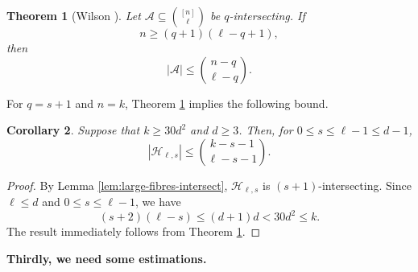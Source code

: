 \documentclass[11pt]{article}
\numberwithin{equation}{section}
\newtheorem{theorem}{Theorem}[section]
\newtheorem{corollary}[theorem]{Corollary}
\begin{document}
	\begin{theorem}[Wilson \cite{Wilson}]\label{thm:wilson}
		Let $\mathcal A\subseteq\binom{[n]}{\ell}$ be $q$-intersecting.  If
		\[
		n\ge (q+1)(\ell-q+1),
		\]
		then
		\[
		|\mathcal A|\le \binom{n-q}{\ell-q}.
		\]
	\end{theorem}
	For $q=s+1$ and $n=k$,  Theorem \ref{thm:wilson} implies the following bound.
	\begin{corollary}\label{cor:H-bound}
		Suppose that $k\ge 30d^2$ and $d\ge 3$.  Then, for $0\le s\le \ell-1\le d-1$,
		\[
		|\mathcal H_{\ell,s}|
		\le
		\binom{k-s-1}{\ell-s-1}.
		\]
	\end{corollary}
	\begin{proof}
		By Lemma \ref{lem:large-fibres-intersect}, $\mathcal H_{\ell,s}$ is $(s+1)$-intersecting.
		Since $\ell\le d$ and $0\le s\le \ell-1$, we have
		\[
		(s+2)(\ell-s)
		\le
		(d+1)d
		<30d^2
		\le k.
		\]
		The result immediately follows from Theorem \ref{thm:wilson}.
	\end{proof}
\medskip

\textbf{Thirdly, we need some estimations.}


\medskip
\end{document}

